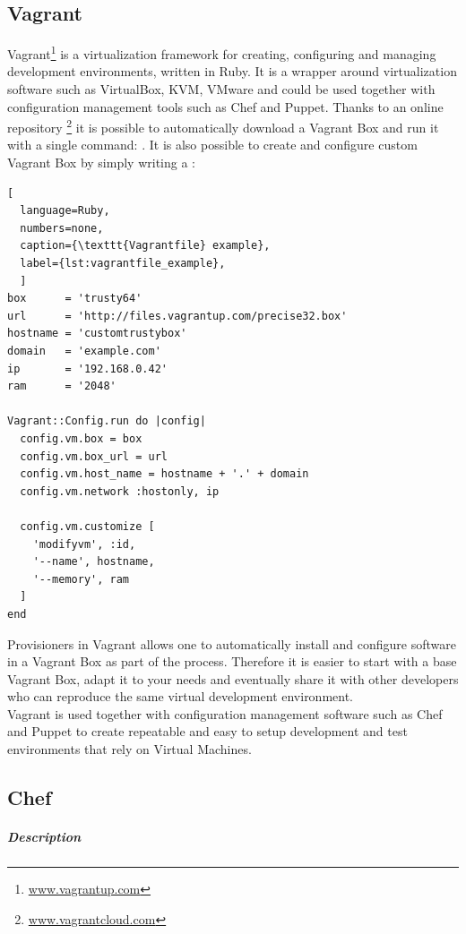 \subsection{Vagrant}
\label{sub:sota_vagrant}
Vagrant\footnote{\url{www.vagrantup.com}} is a virtualization framework for creating, configuring and managing development environments, written in Ruby. It is a wrapper around virtualization software such as VirtualBox, KVM, VMware and could be used together with configuration management tools such as Chef and Puppet.
Thanks to an online repository \footnote{\url{www.vagrantcloud.com}} it is possible to automatically download a Vagrant Box and run it with a single command: .
It is also possible to create and configure custom Vagrant Box by simply writing a :
\begin{lstlisting}[
  language=Ruby,
  numbers=none,
  caption={\texttt{Vagrantfile} example},
  label={lst:vagrantfile_example},
  ]
box      = 'trusty64'
url      = 'http://files.vagrantup.com/precise32.box'
hostname = 'customtrustybox'
domain   = 'example.com'
ip       = '192.168.0.42'
ram      = '2048'

Vagrant::Config.run do |config|
  config.vm.box = box
  config.vm.box_url = url
  config.vm.host_name = hostname + '.' + domain
  config.vm.network :hostonly, ip

  config.vm.customize [
    'modifyvm', :id,
    '--name', hostname,
    '--memory', ram
  ]
end
\end{lstlisting}
Provisioners in Vagrant allows one to automatically install and configure software in a Vagrant Box as part of the  process. Therefore it is easier to start with a base Vagrant Box, adapt it to your needs and eventually share it with other developers who can reproduce the same virtual development environment.\\
Vagrant is used together with configuration management software such as Chef and Puppet to create repeatable and easy to setup development and test environments that rely on Virtual Machines.



\subsection{Chef}
\label{sub:sota_chef}

\subparagraph{Description}
\label{subp:sota_chef_desc}

